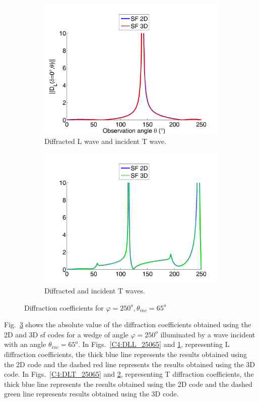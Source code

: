\begin{figure}
\begin{subfigure}[b]{0.49\textwidth}
        \includegraphics[width=\textwidth]{images/chapter4/XpropL_250_65_0_TH.png}
        \caption{Diffracted L wave and incident T wave.}
        \label{C4:DTL_25065}
    \end{subfigure}
    \begin{subfigure}[b]{0.49\textwidth}
        \includegraphics[width=\textwidth]{images/chapter4/XpropTH_250_65_0_TH.png}
        \caption{Diffracted and incident T waves.}
        \label{C4:DTT_25065}
     \end{subfigure}
     \caption{Diffraction coefficients for $\varphi=250^o, \theta_{inc}=65^o$}
     \label{C4:25065}
\end{figure}

Fig.~\ref{C4:25065} shows the absolute value of the diffraction coefficients obtained using the 2D and 3D \acrshort{sf} codes for a wedge of angle $\varphi=250^o$ illuminated by a wave incident with an angle $\theta_{inc}=65^o$. In Figs.~\ref{C4:DLL_25065} and \ref{C4:DTL_25065}, representing L diffraction coefficients, the thick blue line represents the results obtained using the 2D code and the dashed red line represents the results obtained using the 3D code. In Figs.~\ref{C4:DLT_25065} and \ref{C4:DTT_25065}, representing T diffraction coefficients, the thick blue line represents the results obtained using the 2D code and the dashed green line represents results obtained using the 3D code.

